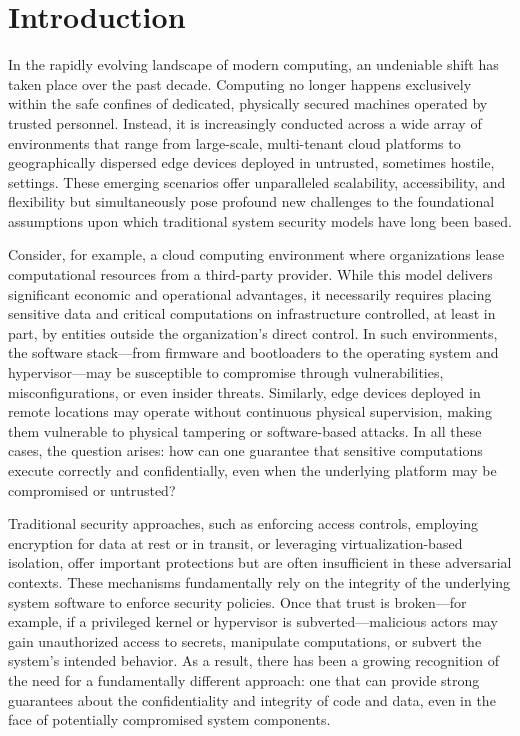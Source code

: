 \chapter{Introduction}
\label{chap:intro}

In the rapidly evolving landscape of modern computing, an undeniable shift has taken place over the past decade. Computing no longer happens exclusively within the safe confines of dedicated, physically secured machines operated by trusted personnel. Instead, it is increasingly conducted across a wide array of environments that range from large-scale, multi-tenant cloud platforms to geographically dispersed edge devices deployed in untrusted, sometimes hostile, settings. These emerging scenarios offer unparalleled scalability, accessibility, and flexibility but simultaneously pose profound new challenges to the foundational assumptions upon which traditional system security models have long been based.

Consider, for example, a cloud computing environment where organizations lease computational resources from a third-party provider. While this model delivers significant economic and operational advantages, it necessarily requires placing sensitive data and critical computations on infrastructure controlled, at least in part, by entities outside the organization’s direct control. In such environments, the software stack—from firmware and bootloaders to the operating system and hypervisor—may be susceptible to compromise through vulnerabilities, misconfigurations, or even insider threats. Similarly, edge devices deployed in remote locations may operate without continuous physical supervision, making them vulnerable to physical tampering or software-based attacks. In all these cases, the question arises: how can one guarantee that sensitive computations execute correctly and confidentially, even when the underlying platform may be compromised or untrusted?

Traditional security approaches, such as enforcing access controls, employing encryption for data at rest or in transit, or leveraging virtualization-based isolation, offer important protections but are often insufficient in these adversarial contexts. These mechanisms fundamentally rely on the integrity of the underlying system software to enforce security policies. Once that trust is broken—for example, if a privileged kernel or hypervisor is subverted—malicious actors may gain unauthorized access to secrets, manipulate computations, or subvert the system’s intended behavior. As a result, there has been a growing recognition of the need for a fundamentally different approach: one that can provide strong guarantees about the confidentiality and integrity of code and data, even in the face of potentially compromised system components.

